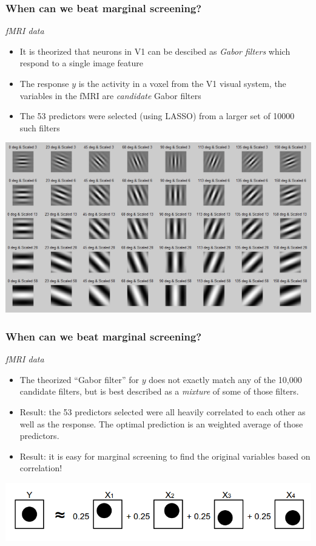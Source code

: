 \documentclass{beamer}
\begin{document}
\begin{frame}
\frametitle{When can we beat marginal screening?}
\emph{fMRI data}

\begin{itemize}
\item It is theorized that neurons in V1 can be descibed as \emph{Gabor filters} which respond to a single image feature
\item The response $y$ is the activity in a voxel from the V1 visual system, the variables in the fMRI are \emph{candidate} Gabor filters
\item The 53 predictors were selected (using LASSO) from a larger set of 10000 such filters
\end{itemize}
\begin{center}
\includegraphics[scale = 0.3, trim=0in 1.23in 0in 1.2in, clip]{gabor.png}
\end{center}
\end{frame}


\begin{frame}
\frametitle{When can we beat marginal screening?}
\emph{fMRI data}
\begin{itemize}
\item The theorized ``Gabor filter'' for $y$ does not exactly match
  any of the 10,000 candidate filters, but is best described as a
  \emph{mixture} of some of those filters.
\item Result: the 53 predictors selected were all heavily correlated to each other as well as the response.
The optimal prediction is an weighted average of those predictors.
\item Result: it is easy for marginal screening to find the original variables based on correlation!
\end{itemize}
\begin{center}
\includegraphics[scale = 0.3]{mixture.png}
\end{center}
\end{frame}
\end{document}
